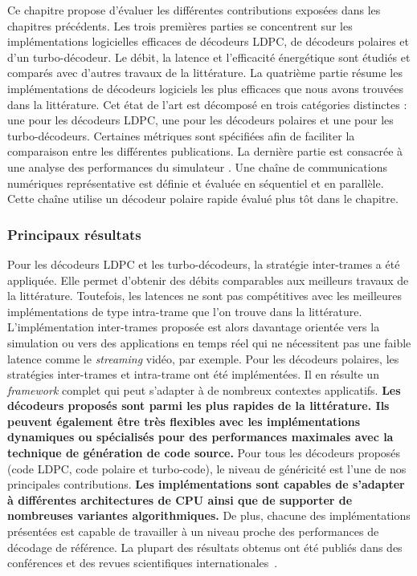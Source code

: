 Ce chapitre propose d'évaluer les différentes contributions exposées dans les
chapitres précédents. Les trois premières parties se concentrent sur les
implémentations logicielles efficaces de décodeurs LDPC, de décodeurs polaires
et d'un turbo-décodeur. Le débit, la latence et l'efficacité énergétique sont
étudiés et comparés avec d'autres travaux de la littérature. La quatrième partie
résume les implémentations de décodeurs logiciels les plus efficaces que nous
avons trouvées dans la littérature. Cet état de l'art est décomposé en trois
catégories distinctes : une pour les décodeurs LDPC, une pour les décodeurs
polaires et une pour les turbo-décodeurs. Certaines métriques sont spécifiées
afin de faciliter la comparaison entre les différentes publications. La dernière
partie est consacrée à une analyse des performances du simulateur \AFFECT. Une
chaîne de communications numériques représentative est définie et évaluée en
séquentiel et en parallèle. Cette chaîne utilise un décodeur polaire rapide
évalué plus tôt dans le chapitre.

\subsubsection*{Principaux résultats}

Pour les décodeurs LDPC et les turbo-décodeurs, la stratégie inter-trames a été
appliquée. Elle permet d'obtenir des débits comparables aux meilleurs travaux de
la littérature. Toutefois, les latences ne sont pas compétitives avec les
meilleures implémentations de type intra-trame que l'on trouve dans la
littérature. L'implémentation inter-trames proposée est alors davantage
orientée vers la simulation ou vers des applications en temps réel qui ne
nécessitent pas une faible latence comme le \emph{streaming} vidéo, par exemple.
Pour les décodeurs polaires, les stratégies inter-trames et intra-trame ont
été implémentées. Il en résulte un \emph{framework} complet qui peut s'adapter à
de nombreux contextes applicatifs. \textbf{Les décodeurs proposés sont parmi les
plus rapides de la littérature. Ils peuvent également être très flexibles avec
les implémentations dynamiques ou spécialisés pour des performances maximales
avec la technique de génération de code source.} Pour tous les décodeurs
proposés (code LDPC, code polaire et turbo-code), le niveau de généricité est
l'une de nos principales contributions. \textbf{Les implémentations sont
capables de s'adapter à différentes architectures de CPU ainsi que de supporter
de nombreuses variantes algorithmiques.} De plus, chacune des implémentations
présentées est capable de travailler à un niveau proche des performances de
décodage de référence. La plupart des résultats obtenus ont été publiés dans des
conférences et des revues scientifiques internationales~\cite{Ghaffari2019,
Leonardon2019,Cassagne2015c,Cassagne2016b,Cassagne2016a}.

